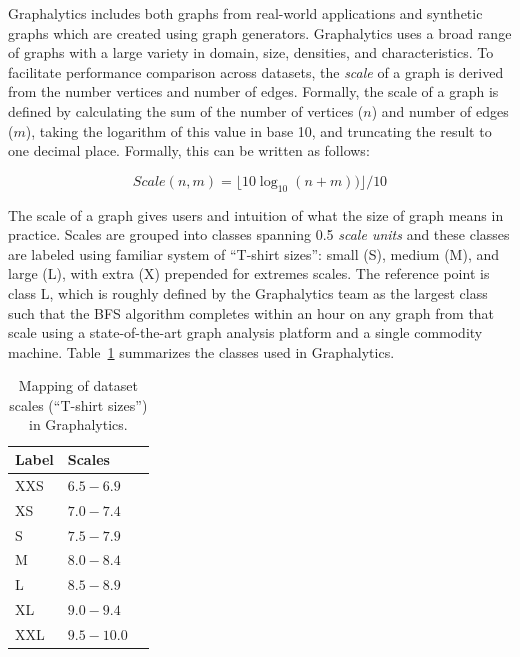Graphalytics includes both graphs from real-world applications and synthetic graphs which are created using graph generators. Graphalytics uses a broad range of graphs with a large variety in domain, size, densities, and characteristics. To facilitate performance comparison across datasets, the \emph{scale} of a graph is derived from the number vertices and number of edges. Formally, the scale of a graph is defined by calculating the sum of the number of vertices ($n$) and number of edges ($m$), taking the logarithm of this value in base 10, and truncating the result to one decimal place. Formally, this can be written as follows:

\begin{equation}
Scale(n, m) = \lfloor 10 \log_{10}(n + m)) \rfloor / 10
\end{equation}

The scale of a graph gives users and intuition of what the size of graph means in practice. Scales are grouped into classes spanning 0.5 \emph{scale units} and these classes are labeled using familiar system of ``T-shirt sizes'': small (S), medium (M), and large (L), with extra (X) prepended for extremes scales. The reference point is class L, which is roughly defined by the Graphalytics team as the largest class such that the BFS algorithm completes within an hour on any graph from that scale using a state-of-the-art graph analysis platform and a single commodity machine. Table~\ref{tab:definition_scales} summarizes the classes used in Graphalytics.


\begin{table}
\caption{Mapping of dataset scales (``T-shirt sizes'') in Graphalytics.}
\label{tab:definition_scales}

\centering
\begin{tabular}{|l||l|l|}
\hline
\textbf{Label} & \textbf{Scales} \\ %
\hline \hline
XXS & $6.5 - 6.9$ %
\\ \hline
XS & $7.0 - 7.4$ %
\\ \hline
S & $7.5-7.9$ %
 \\ \hline
M & $8.0 - 8.4$ %
\\ \hline
L & $8.5 - 8.9$ %
\\ \hline
XL & $9.0 - 9.4$ %
 \\ \hline
XXL & $9.5 - 10.0$ %
\\ \hline
\end{tabular}
\end{table}


